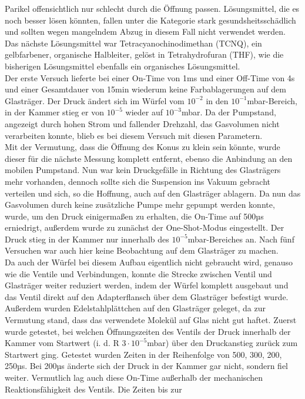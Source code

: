 Parikel offensichtlich nur schlecht durch die Öffnung passen. Lösungsmittel, die es noch besser lösen könnten,
fallen unter die Kategorie stark gesundsheitsschädlich und sollten wegen mangelndem Abzug in diesem Fall nicht
verwendet werden.\\
Das nächste Lösungsmittel war Tetracyanochinodimethan (TCNQ), ein gelbfarbener, organische
Halbleiter, gelöst in Tetrahydrofuran (THF), wie die bisherigen Lösungsmittel ebenfalls ein
organisches Lösungsmittel. \\
Der erste Versuch lieferte bei einer On-Time von 1ms und einer Off-Time von 4s und einer
Gesamtdauer von 15min wiederum keine Farbablagerungen auf dem Glasträger. Der Druck ändert sich im
Würfel vom $10^{-2}$ in den $10^{-1}$mbar-Bereich, in der Kammer stieg er von $10^{-5}$ wieder auf $10^{-3}$mbar. Da der
Pumpstand, angezeigt durch hohen Strom und fallender Drehzahl, das Gasvolumen nicht verarbeiten
konnte, blieb es bei diesem Versuch mit diesen Parametern.\\
Mit der Vermutung, dass die Öffnung des Konus zu klein sein könnte, wurde dieser für die nächste
Messung komplett entfernt, ebenso die Anbindung an den mobilen Pumpstand. Nun war kein Druckgefälle
in Richtung des Glasträgers mehr vorhanden, dennoch sollte sich die Suspension ins Vakuum gebracht
verteilen und sich, so die Hoffnung, auch auf den Glasträger ablagern. Da nun das Gasvolumen durch
keine zusätzliche Pumpe mehr gepumpt werden konnte, wurde, um den Druck einigermaßen zu erhalten,
die On-Time auf 500µs erniedrigt, außerdem wurde zu zunächst der One-Shot-Modus eingestellt. Der
Druck stieg in der Kammer nur innerhalb des $10^{-5}$mbar-Bereiches an. Nach fünf Versuchen war auch
hier keine Beobachtung auf dem Glasträger zu machen. \\
Da auch der Würfel bei diesem Aufbau eigentlich nicht gebraucht wird, genauso wie die Ventile und
Verbindungen, konnte die Strecke zwischen Ventil und Glasträger weiter reduziert werden, indem der
Würfel komplett ausgebaut und das Ventil direkt auf den Adapterflansch über dem Glasträger befestigt
wurde. Außerdem wurden Edelstahlplättchen auf den
Glasträger geleget, da zur Vermutung stand, dass
das verwendete Molekül auf Glas nicht gut haftet.
Zuerst wurde getestet, bei welchen
Öffnungszeiten des Ventils der Druck innerhalb der Kammer vom Startwert (i. d. R $3\cdot10^{-5}$mbar) über den Druckanstieg zurück zum Startwert ging. Getestet wurden Zeiten in der Reihenfolge von 500, 300, 200, 250µs. Bei 200µs änderte sich der Druck in der Kammer gar nicht, sondern fiel weiter. Vermutlich lag auch diese On-Time außerhalb der mechanischen Reaktionsfähigkeit des Ventils. Die Zeiten bis zur
